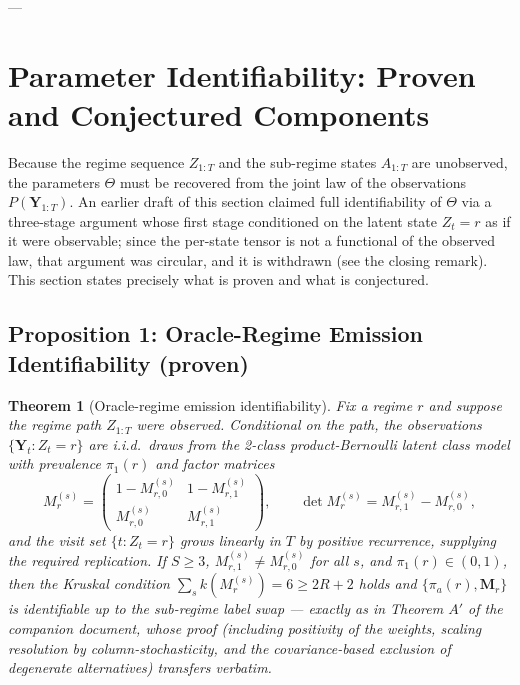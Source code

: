 \documentclass[11pt,a4paper]{article}
\newtheorem{theorem}{Theorem}
\begin{document}
---

\section{Parameter Identifiability: Proven and Conjectured Components}

Because the regime sequence $Z_{1:T}$ and the sub-regime states $A_{1:T}$ are unobserved, the parameters $\Theta$ must be recovered from the joint law of the observations $P(\mathbf{Y}_{1:T})$. An earlier draft of this section claimed full identifiability of $\Theta$ via a three-stage argument whose first stage conditioned on the latent state $Z_t = r$ as if it were observable; since the per-state tensor is not a functional of the observed law, that argument was circular, and it is withdrawn (see the closing remark). This section states precisely what is proven and what is conjectured. %

\subsection{Proposition 1: Oracle-Regime Emission Identifiability (proven)}
\begin{theorem}[Oracle-regime emission identifiability]
Fix a regime $r$ and suppose the regime path $Z_{1:T}$ were observed. Conditional on the path, the observations $\{\mathbf{Y}_t : Z_t = r\}$ are i.i.d.\ draws from the 2-class product-Bernoulli latent class model with prevalence $\pi_1(r)$ and factor matrices %
\[
M^{(s)}_r = \begin{pmatrix} 1 - M^{(s)}_{r, 0} & 1 - M^{(s)}_{r, 1} \\ M^{(s)}_{r, 0} & M^{(s)}_{r, 1} \end{pmatrix}, \qquad \det M^{(s)}_r = M^{(s)}_{r,1} - M^{(s)}_{r,0},
\]
and the visit set $\{t : Z_t = r\}$ grows linearly in $T$ by positive recurrence, supplying the required replication. If $S \ge 3$, $M^{(s)}_{r, 1} \neq M^{(s)}_{r, 0}$ for all $s$, and $\pi_1(r) \in (0, 1)$, then the Kruskal condition $\sum_s k(M^{(s)}_r) = 6 \ge 2R + 2$ holds and $\{\pi_a(r), \mathbf{M}_r\}$ is identifiable up to the sub-regime label swap --- exactly as in Theorem $A'$ of the companion document, whose proof (including positivity of the weights, scaling resolution by column-stochasticity, and the covariance-based exclusion of degenerate alternatives) transfers verbatim. %
\end{theorem}
\end{document}
